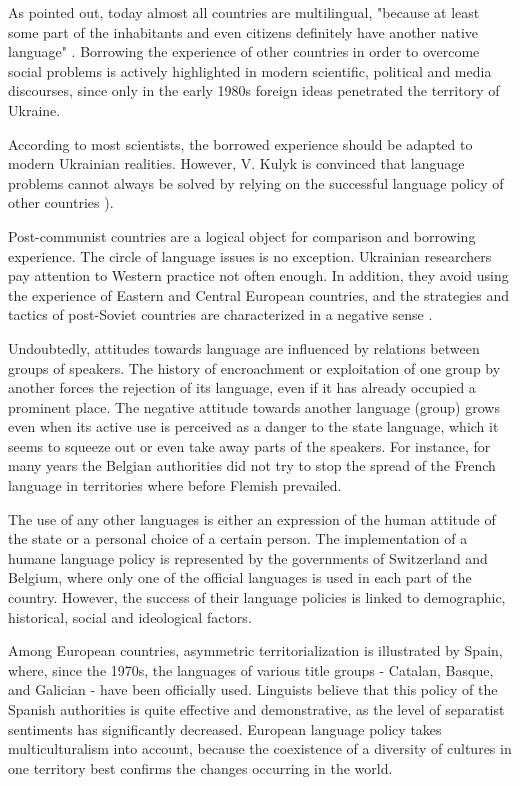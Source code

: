 \documentclass[english]{textolivre}
\begin{document}
As \textcite{kulyk2021} pointed out, today almost all countries are multilingual, "because at least some part of the inhabitants and even citizens definitely have another native language" \cite[p.11]{kulyk2021}. Borrowing the experience of other countries in order to overcome social problems is actively highlighted in modern scientific, political and media discourses, since only in the early 1980s foreign ideas penetrated the territory of Ukraine. 

According to most scientists, the borrowed experience should be adapted to modern Ukrainian realities. However, V. Kulyk is convinced that language problems cannot always be solved by relying on the successful language policy of other countries \cite[p.12]{kulyk2021}).

Post-communist countries are a logical object for comparison and borrowing experience. The circle of language issues is no exception. Ukrainian researchers pay attention to Western practice not often enough. In addition, they avoid using the experience of Eastern and Central European countries, and the strategies and tactics of post-Soviet countries are characterized in a negative sense \cite[p.18]{kulyk2021}.

Undoubtedly, attitudes towards language are influenced by relations between groups of speakers. The history of encroachment or exploitation of one group by another forces the rejection of its language, even if it has already occupied a prominent place. The negative attitude towards another language (group) grows even when its active use is perceived as a danger to the state language, which it seems to squeeze out or even take away parts of the speakers. For instance, for many years the Belgian authorities did not try to stop the spread of the French language in territories where before Flemish prevailed.

The use of any other languages is either an expression of the human attitude of the state or a personal choice of a certain person. The implementation of a humane language policy is represented by the governments of Switzerland and Belgium, where only one of the official languages is used in each part of the country. However, the success of their language policies is linked to demographic, historical, social and ideological factors.

Among European countries, asymmetric territorialization is illustrated by Spain, where, since the 1970s, the languages of various title groups - Catalan, Basque, and Galician - have been officially used. Linguists believe that this policy of the Spanish authorities is quite effective and demonstrative, as the level of separatist sentiments has significantly decreased. European language policy takes multiculturalism into account, because the coexistence of a diversity of cultures in one territory best confirms the changes occurring in the world.
\end{document}
